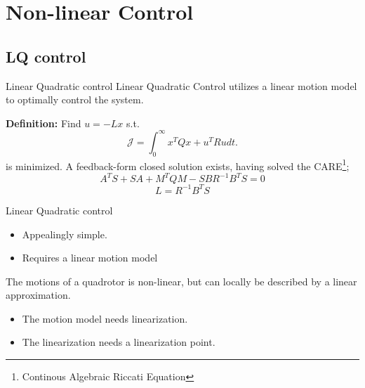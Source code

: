 \section{Non-linear Control}
\subsection{LQ control}
\begin{frame}{Linear Quadratic control}
    Linear Quadratic Control utilizes a linear motion model to optimally
    control the system.

    \textbf{Definition: } Find $u=-Lx$ s.t.
    \scriptsize
    \begin{equation*}
        \mathcal{J} = \int_{0}^{\infty} x^{T}Qx + u^{T}Ru dt.
    \end{equation*}
    \normalsize
    is minimized. A feedback-form closed solution exists, having solved the CARE\footnote{Continous Algebraic Riccati Equation};
    \scriptsize
    \begin{equation*}
        A^{T}S + SA + M^{T}QM - SBR^{-1}B^{T}S = 0
    \end{equation*}
    \begin{equation*}
        L = R^{-1}B^{T}S
    \end{equation*}
\end{frame}
\begin{frame}{Linear Quadratic control}
    \begin{itemize}
        \item Appealingly simple.
        \item Requires a linear motion model
    \end{itemize}

    \vspace{0.5cm}

    The motions of a quadrotor is non-linear, but can locally
    be described by a linear approximation.

    \begin{itemize}
        \item The motion model needs linearization.
        \item The linearization needs a linearization point.
    \end{itemize}
\end{frame}

